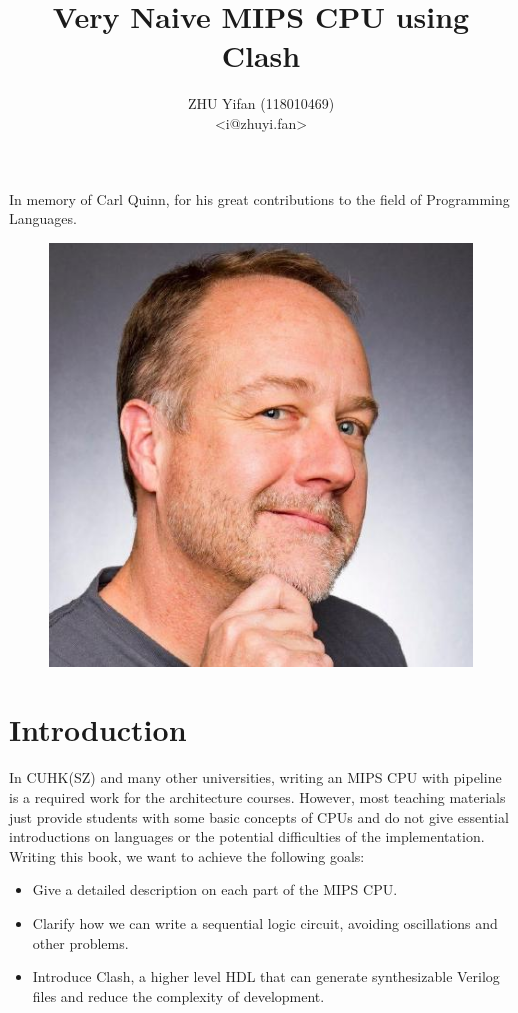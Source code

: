 \documentclass[a4paper,12pt, oneside]{book}
\title{Very Naive MIPS CPU using Clash}
\author{ZHU Yifan (118010469) \\ <i@zhuyi.fan>}
\begin{document}
\frontmatter
\maketitle
\chapter*{}
\vspace*{\fill}
In memory of Carl Quinn, for his great contributions to the field of Programming Languages.
\begin{figure}[H]
	\centering
	\includegraphics[scale=0.8]{cquinn}
\end{figure}
\vspace*{\fill}
\chapter{Introduction}
In CUHK(SZ) and many other universities, writing an MIPS CPU with pipeline is a required work for the  architecture courses. However, most teaching materials just provide students with some basic concepts of CPUs and do not give essential introductions on languages or the potential difficulties of the implementation.
Writing this book, we want to achieve the following goals:
\begin{itemize}
	\item Give a detailed description on each part of the MIPS CPU.
	\item Clarify how we can write a sequential logic circuit, avoiding oscillations and other problems.  
	\item Introduce Clash, a higher level HDL that can generate synthesizable Verilog files and reduce the complexity of development. 
\end{itemize} 
\end{document}
